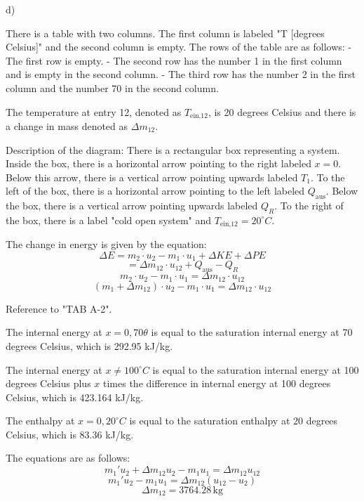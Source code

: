 d)

There is a table with two columns. The first column is labeled "T [degrees Celsius]" and the second column is empty. The rows of the table are as follows:
- The first row is empty.
- The second row has the number 1 in the first column and is empty in the second column.
- The third row has the number 2 in the first column and the number 70 in the second column.

The temperature at entry 12, denoted as \( T_{\text{ein,12}} \), is 20 degrees Celsius and there is a change in mass denoted as \( \Delta m_{12} \).

Description of the diagram: There is a rectangular box representing a system. Inside the box, there is a horizontal arrow pointing to the right labeled \( x=0 \). Below this arrow, there is a vertical arrow pointing upwards labeled \( T_1 \). To the left of the box, there is a horizontal arrow pointing to the left labeled \( Q_{\text{aus}} \). Below the box, there is a vertical arrow pointing upwards labeled \( Q_R \). To the right of the box, there is a label "cold open system" and \( T_{\text{ein,12}} = 20^\circ C \).

The change in energy is given by the equation:
\[ \Delta E = m_2 \cdot u_2 - m_1 \cdot u_1 + \Delta KE + \Delta PE \]
\[ = \Delta m_{12} \cdot u_{12} + Q_{\text{aus}} - Q_R \]
\[ m_2 \cdot u_2 - m_1 \cdot u_1 = \Delta m_{12} \cdot u_{12} \]
\[ (m_1 + \Delta m_{12}) \cdot u_2 - m_1 \cdot u_1 = \Delta m_{12} \cdot u_{12} \]

Reference to "TAB A-2".

The internal energy at \( x=0, 70 \theta \) is equal to the saturation internal energy at 70 degrees Celsius, which is 292.95 kJ/kg.

The internal energy at \( x \neq 100^\circ C \) is equal to the saturation internal energy at 100 degrees Celsius plus \( x \) times the difference in internal energy at 100 degrees Celsius, which is 423.164 kJ/kg.

The enthalpy at \( x=0, 20^\circ C \) is equal to the saturation enthalpy at 20 degrees Celsius, which is 83.36 kJ/kg.

The equations are as follows:
\[ m_1' u_2 + \Delta m_{12} u_2 - m_1 u_1 = \Delta m_{12} u_{12} \]
\[ m_1' u_2 - m_1 u_1 = \Delta m_{12} (u_{12} - u_2) \]
\[ \Delta m_{12} = 3764.28 \, \text{kg} \]